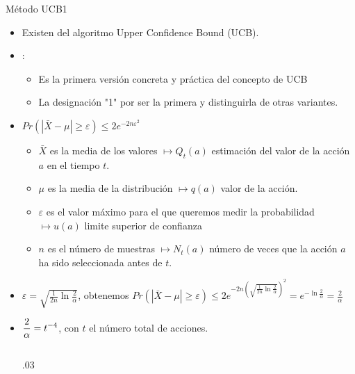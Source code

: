 \documentclass[10pt, envcountsect, handout, aspectratio=1610, hyperref={hypertexnames=true}]{beamer}
\begin{document}

\begin{frame}{Método UCB1}

\begin{itemize}
\item Existen  del algoritmo Upper Confidence Bound (UCB). 

\item \cite{Auer2002}: 
	\begin{itemize}
	\item Es la primera versión concreta y práctica del concepto de UCB 
	\item La designación "1"\/ por ser la primera y distinguirla de otras variantes.
	\end{itemize}

\item {} $Pr\left (|\bar {X} - \mu| \ge \varepsilon \right)  \le 2 e^{-2 n \varepsilon^2}$
	\begin{itemize}
	\item $\bar {X}$ es la media de los valores $\mapsto Q_t(a)$ estimación del valor de la acción \( a \) en el tiempo \( t \).
	\item $\mu$ es la media de la distribución $\mapsto q(a)$ valor de la acción.
	\item $\varepsilon$ es el valor máximo para el que queremos medir la probabilidad $\mapsto u(a)$ limite superior de confianza
	\item $n$ es el número de muestras $\mapsto N_t(a)$ número de veces que la acción $a$ ha sido seleccionada antes de $t$.
	\end{itemize}

\item {}  $\varepsilon = \sqrt {\frac {1} {2n} \ln {\frac {2} {\alpha}}}$, obtenemos
$
Pr\left (|\bar {X} - \mu| \ge \varepsilon \right) \le 
2 e^{-2 n \left( \sqrt {\frac {1} {2n} \ln {\frac {2} {\alpha}}} \right) ^2} = 
e^{-\ln \frac{2}{\alpha}}=\frac{2}{\alpha}
$

\item {} $\displaystyle\frac{2}{\alpha}=t^{-4}$, con $t$ el número total de acciones.

\begin{columns}
\begin{column}{.03\textwidth}
\end{column}


\end{columns}
\end{itemize}
\end{frame}
\end{document}
